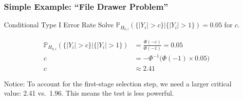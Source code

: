\begin{frame}
  \frametitle{Simple Example: ``File Drawer Problem''}


  \begin{block}{Conditional Type I Error Rate}
  Solve $\mathbb{P}_{H_{0,i}}\left( \{|Y_i| > c\} | \{|Y_i|>1\}\right) = 0.05$ for $c$.
\end{block}

  \begin{align*}
    \mathbb{P}_{H_{0,i}}\left( \{|Y_i| > c\} | \{|Y_i|>1\}\right) &= \frac{\Phi(-c)}{\Phi(-1)} = 0.05\\
    c &= -\Phi^{-1}\big(\Phi(-1) \times 0.05\big)\\
    c &\approx 2.41 
  \end{align*}

  \vspace{-2em}

  \begin{alertblock}{Notice:}
  To account for the first-stage selection step, we need a larger critical value: 2.41 vs.\ 1.96. This means the test is less powerful.
\end{alertblock}


\end{frame}
